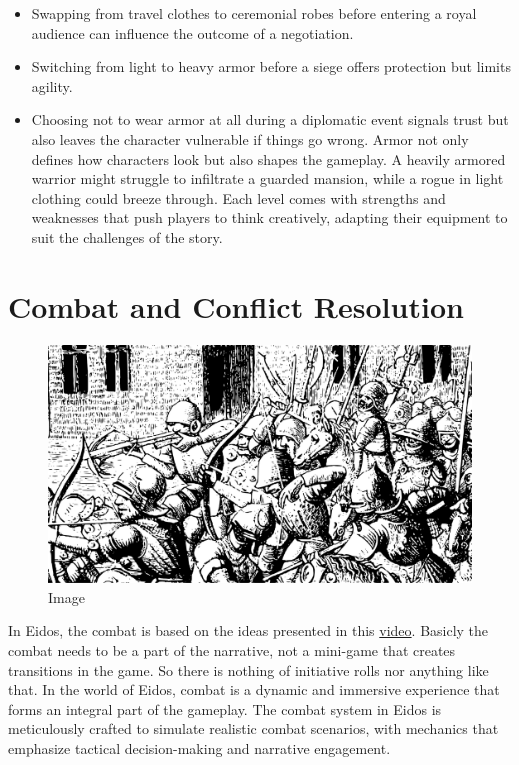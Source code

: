 \begin{itemize}
\item
  Swapping from travel clothes to ceremonial robes before entering a
  royal audience can influence the outcome of a negotiation.
\item
  Switching from light to heavy armor before a siege offers protection
  but limits agility.
\item
  Choosing not to wear armor at all during a diplomatic event signals
  trust but also leaves the character vulnerable if things go wrong.
  Armor not only defines how characters look but also shapes the
  gameplay. A heavily armored warrior might struggle to infiltrate a
  guarded mansion, while a rogue in light clothing could breeze through.
  Each level comes with strengths and weaknesses that push players to
  think creatively, adapting their equipment to suit the challenges of
  the story.
\end{itemize}

\hypertarget{combat-and-conflict-resolution}{%
\section{Combat and Conflict
Resolution}\label{combat-and-conflict-resolution}}

\begin{figure}
\centering
\includegraphics{./images/combat01.pdf}
\caption{Image}
\end{figure}

In Eidos, the combat is based on the ideas presented in this
\href{https://www.youtube.com/watch?v=0o5vWmoS3KU\&ab_channel=SimplyWyvern}{video}.
Basicly the combat needs to be a part of the narrative, not a mini-game
that creates transitions in the game. So there is nothing of initiative
rolls nor anything like that. In the world of Eidos, combat is a dynamic
and immersive experience that forms an integral part of the gameplay.
The combat system in Eidos is meticulously crafted to simulate realistic
combat scenarios, with mechanics that emphasize tactical decision-making
and narrative engagement.

